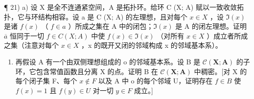 ¶ 21) a) 设 X 是全不连通紧空间，A 是拓扑环。给环 C (X; A) 赋以一致收敛拓扑，它与环结构相容。设 a 是 C (X; A) 的左理想，且对每个 \(x \in X\) ，设 \(\Im(x)\) 是诸 \(f(x)\) （ \(f \in a\) ）所成之集在 A 中的闭包；\(\Im(x)\) 是 A 的闭左理想。证明 \(\overline{a}\) 恒同于一切 \(f \in C(X; A)\) 中使 \(f(x) \in \Im(x)\) （对所有 \(x \in X\) ）成立者所成之集（注意对每个 \(x \in X\) ，x 的既开又闭的邻域构成 x 的邻域基本系）。

\begin{enumerate}
\def\labelenumi{\alph{enumi})}
\setcounter{enumi}{1}
\tightlist
\item
  再假设 A 有一个由双侧理想组成的 o 的邻域基本系。设 B 是 \(\mathcal{C}(\mathbf{X};\mathbf{A})\) 的子环，它包含常值函数且分离 X 的点。证明 B 在 \(\mathcal{C}(\mathbf{X};\mathbf{A})\) 中稠密。{[}对 X 的每个闭子集 F、每个 \(x\notin F\) 以及 A 中 o 的每个邻域 U，证明存在 \(f\in B\) 使 \(f(x)=1\) 且 \(f(y)\in U\) 对一切 \(y\in F\) 成立。{]}
\end{enumerate}

